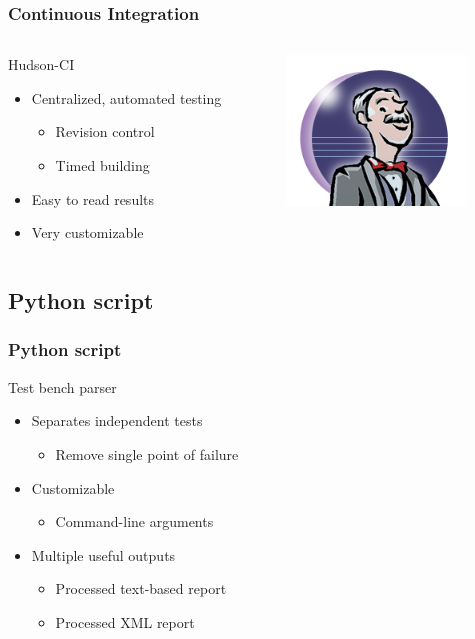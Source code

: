 \documentclass[british,10pt]{beamer}
\begin{document}
\begin{frame}\frametitle{Continuous Integration}
\begin{columns}
\begin{column}{0.6\textwidth}
Hudson-CI
\begin{itemize}
\item Centralized, automated testing
\begin{itemize}
\item Revision control
\item Timed building
\end{itemize}
\item Easy to read results
\item Very customizable
\end{itemize}
\end{column}
\includegraphics[width=0.8\textwidth]{images/hudson.png}
\end{columns}
\end{frame}

\subsection{Python script}

\begin{frame}\frametitle{Python script}
Test bench parser
\begin{itemize}
\item Separates independent tests
\begin{itemize}
\item Remove single point of failure
\end{itemize}
\item Customizable
\begin{itemize}
\item Command-line arguments
\end{itemize}
\item Multiple useful outputs
\begin{itemize}
\item Processed text-based report
\item Processed XML report
\end{itemize}
\end{itemize}
\end{frame}
\end{document}
